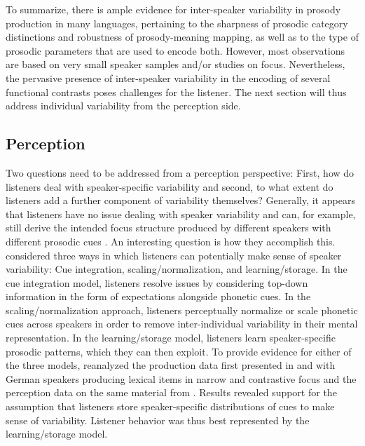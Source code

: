 To summarize, there is ample evidence for inter-speaker variability in prosody production in many languages, pertaining to the sharpness of prosodic category distinctions and robustness of prosody-meaning mapping, as well as to the type of prosodic parameters that are used to encode both. However, most observations are based on very small speaker samples and/or studies on focus. Nevertheless, the pervasive presence of inter-speaker variability in the encoding of several functional contrasts poses challenges for the listener. The next section will thus address individual variability from the perception side.

\subsection{Perception} \label{sec:ind_perception}

Two questions need to be addressed from a perception perspective: First, how do listeners deal with speaker-specific variability and second, to what extent do listeners add a further component of variability themselves? Generally, it appears that listeners have no issue dealing with speaker variability and can, for example, still derive the intended focus structure produced by different speakers with different prosodic cues \citep{griceIntegratingDiscretenessContinuity2017}. An interesting question is how they accomplish this. \citet{kurumadaThinkingProbabilisticallyStudy2021} considered three ways in which listeners can potentially make sense of speaker variability: Cue integration, scaling/normalization, and learning/storage. In the cue integration model, listeners resolve issues by considering top-down information in the form of expectations alongside phonetic cues. In the scaling/normalization approach, listeners perceptually normalize or scale phonetic cues across speakers in order to remove inter-individual variability in their mental representation. In the learning/storage model, listeners learn speaker-specific prosodic patterns, which they can then exploit. To provide evidence for either of the three models, \citet{kurumadaThinkingProbabilisticallyStudy2021} reanalyzed the production data first presented in \citet{muckeEffectFocusMarking2014} and \citet{griceIntegratingDiscretenessContinuity2017} with German speakers producing lexical items in narrow and contrastive focus and the perception data on the same material from \citet{cangemiListenerSpecificPerceptionSpeakerSpecific2015}. Results revealed support for the assumption that listeners store speaker-specific distributions of cues to make sense of variability. Listener behavior was thus best represented by the learning/storage model.

